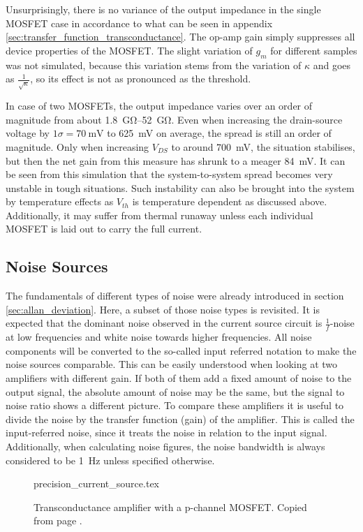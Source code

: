 Unsurprisingly, there is no variance of the output impedance in the single MOSFET case in accordance to what can be seen in appendix \ref{sec:transfer_function_transconductance}. The op-amp gain simply suppresses all device properties of the MOSFET. The slight variation of $g_m$ for different samples was not simulated, because this variation stems from the variation of $\kappa$ and goes as $\frac{1}{\sqrt{\kappa}}$, so its effect is not as pronounced as the threshold.

In case of two MOSFETs, the output impedance varies over an order of magnitude from about \qtyrange[range-units = single]{1.8}{52}{\giga \ohm}. Even when increasing the drain-source voltage by $1 \sigma = \qty{70}{\mV}$ to \qty{625}{\mV} on average, the spread is still an order of magnitude. Only when increasing $V_{DS}$ to around \qty{700}{\mV}, the situation stabilises, but then the net gain from this measure has shrunk to a meager \qty{84}{\mV}. It can be seen from this simulation that the system-to-system spread becomes very unstable in tough situations. Such instability can also be brought into the system by temperature effects as $V_{th}$ is temperature dependent as discussed above. Additionally, it may suffer from thermal runaway unless each individual MOSFET is laid out to carry the full current.

\subsection{Noise Sources}%
\label{sec:current_source_noise}
The fundamentals of different types of noise were already introduced in section \ref{sec:allan_deviation}. Here, a subset of those noise types is revisited. It is expected that the dominant noise observed in the current source circuit is $\frac{1}{f}$-noise at low frequencies and white noise towards higher frequencies. All noise components will be converted to the so-called input referred notation to make the noise sources comparable. This can be easily understood when looking at two amplifiers with different gain. If both of them add a fixed amount of noise to the output signal, the absolute amount of noise may be the same, but the signal to noise ratio shows a different picture. To compare these amplifiers it is useful to divide the noise by the transfer function (gain) of the amplifier. This is called the input-referred noise, since it treats the noise in relation to the input signal. Additionally, when calculating noise figures, the noise bandwidth is always considered to be \qty{1}{\Hz} unless specified otherwise.
\begin{figure}[ht]
    \centering
    {precision_current_source.tex}
    \caption{Transconductance amplifier with a p-channel MOSFET. Copied from page \pageref{fig:precision_current_source}.}
    \label{fig:precision_current_source_noise}
\end{figure}

